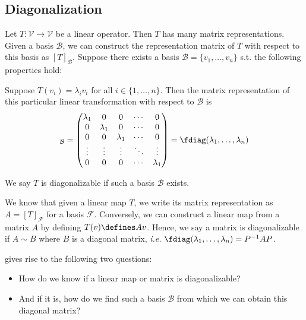 \subsection{Diagonalization}\label{subsubsec-diagonalization}

\begin{thm}\label{thm-diagonalizable-linear-map}
	Let $T:\mathcal{V}\to\mathcal{V}$ be a linear operator. Then $T$ has many matrix
	representations. Given a basis $\mathcal{B}$, we can construct the representation
	matrix of $T$ with respect to this basis as $[T]_\mathcal{B}$. Suppose there exists
	a basis $\mathcal{B}=\{v_1,\dots,v_n\}$ s.t. the following properties hold:
	\begin{flushleft}
		Suppose $T(v_i)=\lambda_i v_i$ for all $i\in\{1,\dots,n\}$. Then the matrix
		representation of this particular linear transformation with respect to
		$\mathcal{B}$ is
		\begin{equation}
			[T]_\mathcal{B}=\begin{pmatrix}
				\lambda_1 & 0         & 0         & \cdots & 0         \\
				0         & \lambda_1 & 0         & \cdots & 0         \\
				0         & 0         & \lambda_1 & \cdots & 0         \\
				\vdots    & \vdots    & \vdots    & \ddots & \vdots    \\
				0         & 0         & 0         & \cdots & \lambda_1
			\end{pmatrix}=\fdiag(\lambda_1,\dots,\lambda_n)
		\end{equation}
	\end{flushleft}
	We say $T$ is diagonalizable if such a basis $\mathcal{B}$ exists.
\end{thm}

\begin{rem}\label{rem-linear-map-diagonalizable}
	We know that given a linear map $T$, we write its matrix representation as
	$A=[T]_\mathcal{F}$ for a basis $\mathcal{F}$. Conversely, we can construct
	a linear map from a matrix $A$ by defining $T(v)\defines Av$. Hence, we say
	a matrix is diagonalizable if $A \sim B$ where $B$ is a diagonal matrix,
	\textit{i.e.} $\fdiag(\lambda_1,\dots,\lambda_n)=P^{-1}AP$.
\end{rem}

\begin{rem}
	 gives rise to the following two questions:
	\begin{itemize}
		\item How do we know if a linear map or matrix is diagonalizable?
		\item And if it is, how do we find such a basis $\mathcal{B}$ from which
		      we can obtain this diagonal matrix?
	\end{itemize}
\end{rem}

